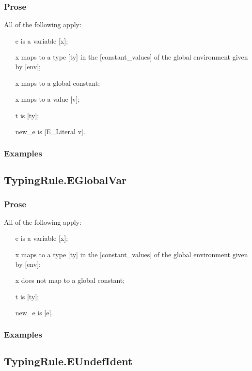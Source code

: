 \documentclass{book}
\begin{document}
  \subsubsection{Prose}
  All of the following apply:
  \begin{itemize}
  \item  [e] is a variable [x];
  \item  [x] maps to a type [ty] in the [constant\_values] of the global environment given by [env];
  \item  [x] maps to a global constant;
  \item  [x] maps to a value [v];
  \item  [t] is [ty];
  \item  [new\_e] is [E\_Literal v].
  \end{itemize}

  \subsubsection{Examples}

\subsection{TypingRule.EGlobalVar}

  \subsubsection{Prose}
  All of the following apply:
  \begin{itemize}
  \item  [e] is a variable [x];
  \item  [x] maps to a type [ty] in the [constant\_values] of the global environment given by [env];
  \item  [x] does not map to a global constant;
  \item  [t] is [ty];
  \item  [new\_e] is [e].
  \end{itemize}

  \subsubsection{Examples}

\subsection{TypingRule.EUndefIdent}
\end{document}
